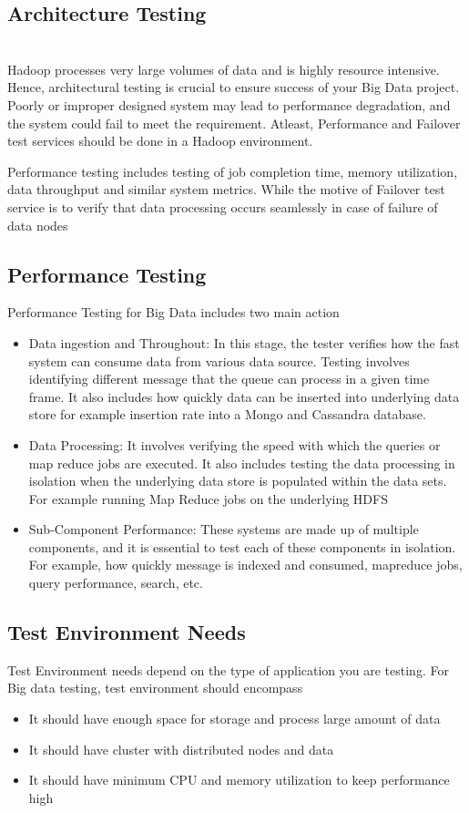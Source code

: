 \begin{itemize}
\subsection{Architecture Testing}
\\
Hadoop processes very large volumes of data and is highly resource intensive. Hence, architectural testing is crucial to ensure success of your Big Data project. Poorly or improper designed system may lead to performance degradation, and the system could fail to meet the requirement. Atleast, Performance and Failover test services should be done in a Hadoop environment.

Performance testing includes testing of job completion time, memory utilization, data throughput and similar system metrics. While the motive of Failover test service is to verify that data processing occurs seamlessly in case of failure of data nodes

\subsection{Performance Testing}
Performance Testing for Big Data includes two main action
\begin{itemize}
	\item Data ingestion and Throughout: In this stage, the tester verifies how the fast system can consume data from various data source. Testing involves identifying different message that the queue can process in a given time frame. It also includes how quickly data can be inserted into underlying data store for example insertion rate into a Mongo and Cassandra database.
	\item Data Processing: It involves verifying the speed with which the queries or map reduce jobs are executed. It also includes testing the data processing in isolation when the underlying data store is populated within the data sets. For example running Map Reduce jobs on the underlying HDFS
	\item Sub-Component Performance: These systems are made up of multiple components, and it is essential to test each of these components in isolation. For example, how quickly message is indexed and consumed, mapreduce jobs, query performance, search, etc.
\end{itemize}


\subsection{Test Environment Needs}
Test Environment needs depend on the type of application you are testing. For Big data testing, test environment should encompass
\begin{itemize}
	\item It should have enough space for storage and process large amount of data
	\item It should have cluster with distributed nodes and data
	\item It should have minimum CPU and memory utilization to keep performance high
\end{itemize}
	

\end{itemize}
